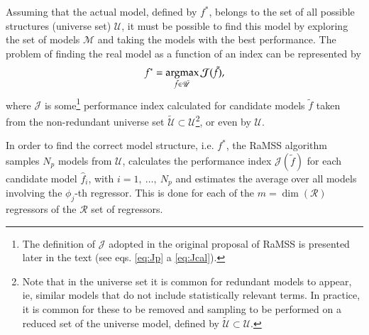 Assuming that the actual model, defined by $f^*$, belongs to the set of all possible structures (universe set) $\mathscr{U}$, it must be possible to find this model by exploring the set of models $\mathscr{M}$ and taking the models with the best performance. The problem of finding the real model as a function of an index can be represented by
\begin{equation}
   f^* = \operatorname*{argmax}_{\tilde{f} \in \tilde{\mathscr{U}}} \mathcal{J}(\tilde{f}),
\label{eq:fStar}
\end{equation}
where $ \mathcal{J}$ is some\footnote{The definition of $\mathcal{J}$ adopted in the original proposal of RaMSS is presented later in the text (see eqs. \ref{eq:Jp} a \ref{eq:Jcal}). } performance index calculated for candidate models $\tilde{f}$ taken from the non-redundant universe set $\tilde{\mathscr{U}} \subset{\mathscr{U}}$\footnote {Note that in the universe set it is common for redundant models to appear, ie, similar models that do not include statistically relevant terms. In practice, it is common for these to be removed and sampling to be performed on a reduced set of the universe model, defined by $\tilde{\mathscr{U}} \subset \mathscr{U}$.}, or even by $ \mathscr{U}$.


In order to find the correct model structure, i.e. $ f^*$, the RaMSS algorithm samples $N_p$ models from $ \mathscr{U}$, calculates the performance index $\mathcal{J}(\tilde{f})$ for each candidate model $\hat{f}_{i}$, with $i=1,\ \dots,\ N_p$ and estimates the average over all models involving the $\phi_j$-th regressor. This is done for each of the $m=\dim(\mathscr{R})$ regressors of the $\mathscr{R}$ set of regressors.

